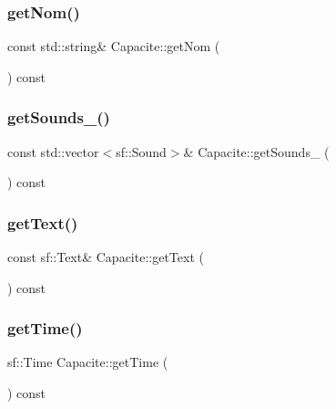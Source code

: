 \mbox{\label{class_capacite_a36ba3cb1e9a72586dff32fa7f0df85cf}} 
\subsubsection{\texorpdfstring{get\+Nom()}{getNom()}}
{\footnotesize\ttfamily const std\+::string\& Capacite\+::get\+Nom (\begin{DoxyParamCaption}{ }\end{DoxyParamCaption}) const\hspace{0.3cm}{\ttfamily [inline]}}

\mbox{\label{class_capacite_aec0e0991421f2675830b7234fe494709}} 
\subsubsection{\texorpdfstring{get\+Sounds\+\_\+()}{getSounds\_()}}
{\footnotesize\ttfamily const std\+::vector$<$sf\+::\+Sound$>$\& Capacite\+::get\+Sounds\+\_\+ (\begin{DoxyParamCaption}{ }\end{DoxyParamCaption}) const\hspace{0.3cm}{\ttfamily [inline]}}

\mbox{\label{class_capacite_a91f1a5f98354c08f75caf99b0513d3c4}} 
\subsubsection{\texorpdfstring{get\+Text()}{getText()}}
{\footnotesize\ttfamily const sf\+::\+Text\& Capacite\+::get\+Text (\begin{DoxyParamCaption}{ }\end{DoxyParamCaption}) const\hspace{0.3cm}{\ttfamily [inline]}}

\mbox{\label{class_capacite_ad14b4e98b6d30717a40f8b57a56af085}} 
\subsubsection{\texorpdfstring{get\+Time()}{getTime()}}
{\footnotesize\ttfamily sf\+::\+Time Capacite\+::get\+Time (\begin{DoxyParamCaption}{ }\end{DoxyParamCaption}) const\hspace{0.3cm}{\ttfamily [inline]}}

